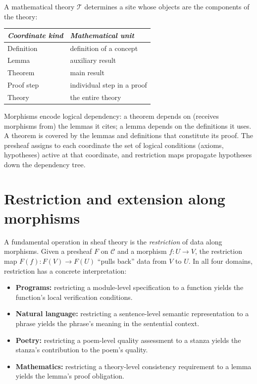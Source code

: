 \begin{example}[Mathematics]
\label{ex:site:math}
A mathematical theory $\mathcal{T}$ determines a site whose objects
are the components of the theory:
\begin{center}
\begin{tabular}{ll}
\emph{Coordinate kind} & \emph{Mathematical unit} \\
\hline
Definition  & definition of a concept \\
Lemma       & auxiliary result \\
Theorem     & main result \\
Proof step  & individual step in a proof \\
Theory      & the entire theory
\end{tabular}
\end{center}
Morphisms encode logical dependency: a theorem depends on (receives
morphisms from) the lemmas it cites; a lemma depends on the
definitions it uses.  A theorem is covered by the lemmas and
definitions that constitute its proof.  The presheaf assigns to each
coordinate the set of logical conditions (axioms, hypotheses) active
at that coordinate, and restriction maps propagate hypotheses down the
dependency tree.
\end{example}



\section{Restriction and extension along morphisms}
\label{sec:sites:restriction}

A fundamental operation in sheaf theory is the \emph{restriction} of
data along morphisms.  Given a presheaf $F$ on $\mathcal{C}$ and a
morphism $f : U \to V$, the restriction map $F(f) : F(V) \to F(U)$
``pulls back'' data from $V$ to $U$.  In all four domains, restriction
has a concrete interpretation:

\begin{itemize}
\item \textbf{Programs:} restricting a module-level specification to a
  function yields the function's local verification conditions.

\item \textbf{Natural language:} restricting a sentence-level semantic
  representation to a phrase yields the phrase's meaning in the
  sentential context.

\item \textbf{Poetry:} restricting a poem-level quality assessment to a
  stanza yields the stanza's contribution to the poem's quality.

\item \textbf{Mathematics:} restricting a theory-level consistency
  requirement to a lemma yields the lemma's proof obligation.
\end{itemize}

